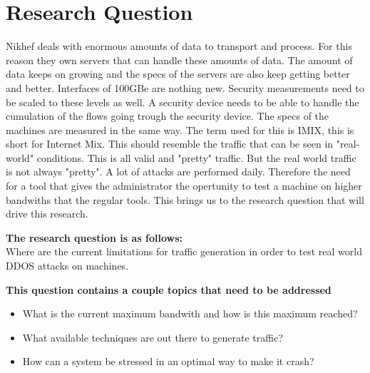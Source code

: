 \section{Research Question}

Nikhef deals with enormous amounts of data to transport and process. For this reason they own servers that can handle these amounts of data. The amount of data keeps on growing and the specs of the servers are also keep getting better and better. Interfaces of 100GBe are nothing new. 
Security measurements need to be scaled to these levels as well. A security device needs to be able to handle the cumulation of the flows going trough the security device. The specs of the machines are measured in the same way. The term used for this is IMIX, this is short for Internet Mix. This should resemble the traffic that can be seen in "real-world" conditions. This is all valid and "pretty" traffic. But the real world traffic is not always "pretty". A lot of attacks are performed daily. Therefore the need for a tool that gives the administrator the opertunity to test a machine on higher bandwiths that the regular tools. This brings us to the research question that will drive this research. 
  
\textbf{The research question is as follows:}\\
Where are the current limitations for traffic generation in order to test real world DDOS attacks on machines.

\textbf{This question contains a couple topics that need to be addressed}\\
\begin{itemize}
\item{What is the current maximum bandwith and how is this maximum reached?}
\item{What available techniques are out there to generate traffic?}
\item{How can a system be stressed in an optimal way to make it crash?}
\end{itemize}

